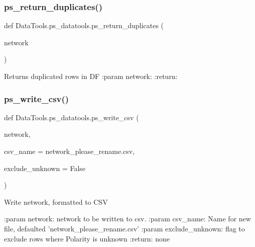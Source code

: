 \subsubsection{\texorpdfstring{ps\+\_\+return\+\_\+duplicates()}{ps\_return\_duplicates()}}
{\footnotesize\ttfamily def Data\+Tools.\+ps\+\_\+datatools.\+ps\+\_\+return\+\_\+duplicates (\begin{DoxyParamCaption}\item[{}]{network }\end{DoxyParamCaption})}

\begin{DoxyVerb}Returns duplicated rows in DF
:param network:
:return:
\end{DoxyVerb}
 \mbox{\label{namespace_data_tools_1_1ps__datatools_a5af601118f566110be97342fef324966}} 
\subsubsection{\texorpdfstring{ps\+\_\+write\+\_\+csv()}{ps\_write\_csv()}}
{\footnotesize\ttfamily def Data\+Tools.\+ps\+\_\+datatools.\+ps\+\_\+write\+\_\+csv (\begin{DoxyParamCaption}\item[{}]{network,  }\item[{}]{csv\+\_\+name = {\ttfamily \textquotesingle{}network\+\_\+please\+\_\+rename.csv\textquotesingle{}},  }\item[{}]{exclude\+\_\+unknown = {\ttfamily False} }\end{DoxyParamCaption})}

\begin{DoxyVerb}Write network, formatted to CSV

:param network: network to be written to csv.
:param csv_name: Name for new file, defaulted 'network_please_rename.csv'
:param exclude_unknown: flag to exclude rows where Polarity is unknown
:return: none
\end{DoxyVerb}
 